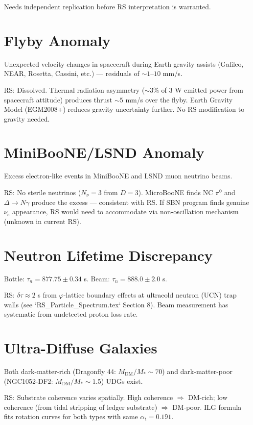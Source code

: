 \documentclass[12pt,a4paper]{article}
\theoremstyle{definition}
\theoremstyle{remark}
\begin{document}
Needs independent replication before RS interpretation is warranted.

\section{Flyby Anomaly}

Unexpected velocity changes in spacecraft during Earth gravity assists (Galileo, NEAR, 
Rosetta, Cassini, etc.) — residuals of $\sim 1$–$10$ mm/s.

RS: Dissolved. Thermal radiation asymmetry ($\sim 3\%$ of 3 W emitted power 
from spacecraft attitude) produces thrust $\sim 5$ mm/s over the flyby. 
Earth Gravity Model (EGM2008+) reduces gravity uncertainty further. 
No RS modification to gravity needed.

\section{MiniBooNE/LSND Anomaly}

Excess electron-like events in MiniBooNE and LSND muon neutrino beams.

RS: No sterile neutrinos ($N_\nu = 3$ from $D = 3$). 
MicroBooNE finds NC $\pi^0$ and $\Delta \to N\gamma$ produce the excess — 
consistent with RS. If SBN program finds genuine $\nu_e$ appearance, RS would 
need to accommodate via non-oscillation mechanism (unknown in current RS).

\section{Neutron Lifetime Discrepancy}

Bottle: $\tau_n = 877.75 \pm 0.34$ s. Beam: $\tau_n = 888.0 \pm 2.0$ s.

RS: $\delta\tau \approx 2$ s from $\varphi$-lattice boundary effects at 
ultracold neutron (UCN) trap walls (see `RS_Particle_Spectrum.tex` Section 8). 
Beam measurement has systematic from undetected proton loss rate.

\section{Ultra-Diffuse Galaxies}

Both dark-matter-rich (Dragonfly 44: $M_\mathrm{DM}/M_* \sim 70$) and 
dark-matter-poor (NGC1052-DF2: $M_\mathrm{DM}/M_* \sim 1.5$) UDGs exist.

RS: Substrate coherence varies spatially. High coherence $\Rightarrow$ DM-rich; 
low coherence (from tidal stripping of ledger substrate) $\Rightarrow$ DM-poor. 
ILG formula fits rotation curves for both types with same $\alpha_t = 0.191$.
\end{document}
